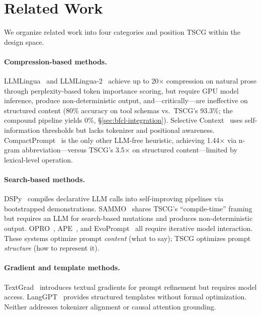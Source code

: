 \section{Related Work}
\label{sec:related}


We organize related work into four categories and position TSCG within the design space.

\paragraph{Compression-based methods.}
LLMLingua~\cite{jiang2023llmlingua} and LLMLingua-2~\cite{pan2024llmlingua2} achieve up to 20$\times$ compression on natural prose through perplexity-based token importance scoring, but require GPU model inference, produce non-deterministic output, and---critically---are ineffective on structured content (80\% accuracy on tool schemas vs.\ TSCG's 93.3\%; the compound pipeline yields 0\%, \S\ref{sec:bfcl-integration}).
Selective Context~\cite{li2023compressing} uses self-information thresholds but lacks tokenizer and positional awareness.
CompactPrompt~\cite{compactprompt2025} is the only other LLM-free heuristic, achieving 1.44$\times$ via n-gram abbreviation---versus TSCG's 3.5$\times$ on structured content---limited by lexical-level operation.

\paragraph{Search-based methods.}
DSPy~\cite{khattab2023dspy} compiles declarative LLM calls into self-improving pipelines via bootstrapped demonstrations.
SAMMO~\cite{schlegel2024sammo} shares TSCG's ``compile-time'' framing but requires an LLM for search-based mutations and produces non-deterministic output.
OPRO~\cite{yang2024large}, APE~\cite{zhou2023large}, and EvoPrompt~\cite{chen2024evoprompt} all require iterative model interaction.
These systems optimize prompt \emph{content} (what to say); TSCG optimizes prompt \emph{structure} (how to represent it).

\paragraph{Gradient and template methods.}
TextGrad~\cite{yuksekgonul2024textgrad} introduces textual gradients for prompt refinement but requires model access.
LangGPT~\cite{wang2024langgpt} provides structured templates without formal optimization.
Neither addresses tokenizer alignment or causal attention grounding.

